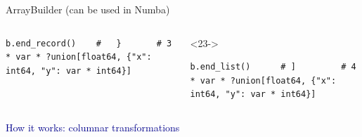 \documentclass[aspectratio=169]{beamer}
\begin{document}
\begin{frame}[fragile]{ArrayBuilder (can be used in Numba)}
\begin{columns}
\begin{uncoverenv}
\begin{verbatim}
b.end_record()    #   }       # 3 * var * ?union[float64, {"x": int64, "y": var * int64}]
\end{verbatim}
\end{uncoverenv}
\vspace{-0.43 cm}
\begin{uncoverenv}<23->
\begin{verbatim}
b.end_list()      # ]         # 4 * var * ?union[float64, {"x": int64, "y": var * int64}]
\end{verbatim}
\end{uncoverenv}
\end{columns}
\end{frame}

\begin{frame}{}
\Huge
\vspace{1 cm}
\begin{center}
\textcolor{darkblue}{How it works: columnar transformations}
\end{center}
\end{frame}
\end{document}
